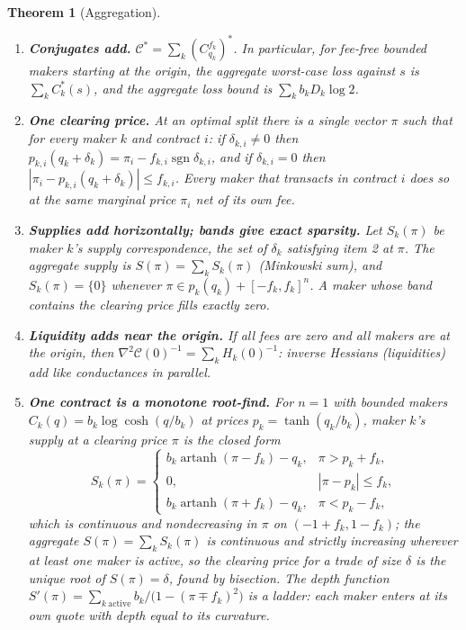 \documentclass[11pt]{article}
\newtheorem{theorem}{Theorem}[section]
\theoremstyle{definition}
\theoremstyle{remark}
\newcommand{\sgn}{\operatorname{sgn}}
\newcommand{\artanh}{\operatorname{artanh}}
\begin{document}
\begin{theorem}[Aggregation]\label{thm:book}
\begin{enumerate}[leftmargin=2em,itemsep=2pt]
\item \textbf{Conjugates add.} $\mathcal{C}^{*}=\sum_k(C^{f_k}_{q_k})^{*}$. In particular, for fee-free bounded makers
starting at the origin, the aggregate worst-case loss against $s$ is $\sum_k C_k^{*}(s)$, and the aggregate loss bound
is $\sum_k b_kD_k\log2$.

\item \textbf{One clearing price.} At an optimal split there is a single vector $\pi$ such that for every maker $k$
and contract $i$: if $\delta_{k,i}\ne0$ then $p_{k,i}(q_k+\delta_k)=\pi_i-f_{k,i}\sgn\delta_{k,i}$, and if
$\delta_{k,i}=0$ then $|\pi_i-p_{k,i}(q_k+\delta_k)|\le f_{k,i}$. Every maker that transacts in contract $i$ does so
at the same marginal price $\pi_i$ net of its own fee.

\item \textbf{Supplies add horizontally; bands give exact sparsity.} Let $S_k(\pi)$ be maker $k$'s supply
correspondence, the set of $\delta_k$ satisfying item 2 at $\pi$. The aggregate supply is $S(\pi)=\sum_kS_k(\pi)$
(Minkowski sum), and $S_k(\pi)=\{0\}$ whenever $\pi\in p_k(q_k)+[-f_k,f_k]^{n}$. A maker whose band contains the
clearing price fills exactly zero.

\item \textbf{Liquidity adds near the origin.} If all fees are zero and all makers are at the origin, then
$\nabla^{2}\mathcal{C}(0)^{-1}=\sum_k H_k(0)^{-1}$: inverse Hessians (liquidities) add like conductances in parallel.

\item \textbf{One contract is a monotone root-find.} For $n=1$ with bounded makers $C_k(q)=b_k\log\cosh(q/b_k)$ at
prices $p_k=\tanh(q_k/b_k)$, maker $k$'s supply at a clearing price $\pi$ is the closed form
\begin{equation}\label{eq:supply1d}
S_k(\pi)=
\begin{cases}
b_k\artanh(\pi-f_k)-q_k, & \pi>p_k+f_k,\\
0, & |\pi-p_k|\le f_k,\\
b_k\artanh(\pi+f_k)-q_k, & \pi<p_k-f_k,
\end{cases}
\end{equation}
which is continuous and nondecreasing in $\pi$ on $(-1+f_k,1-f_k)$; the aggregate $S(\pi)=\sum_kS_k(\pi)$ is
continuous and strictly increasing wherever at least one maker is active, so the clearing price for a trade of size
$\delta$ is the unique root of $S(\pi)=\delta$, found by bisection. The depth function
$S'(\pi)=\sum_{k\ \text{active}}b_k\big/\big(1-(\pi\mp f_k)^{2}\big)$ is a ladder: each maker enters at its own quote
with depth equal to its curvature.
\end{enumerate}
\end{theorem}
\end{document}
